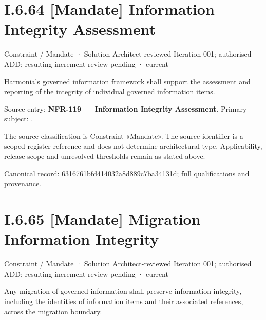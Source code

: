 \section*{I.6.64 [Mandate] Information Integrity Assessment}
\label{navigation:I.6.64}

\label{element:6316761bfd414032a8d889c7ba34131d}
{\small Constraint / Mandate · Solution Architect-reviewed Iteration 001; authorised ADD; resulting increment review pending · current}\par

Harmonia's governed information framework shall support the assessment and reporting of the integrity of individual governed information items.



Source entry: \textbf{NFR-119 — Information Integrity Assessment}. Primary subject: \texttt{}.



The source classification is Constraint «Mandate». The source identifier is a scoped register reference and does not determine architectural type. Applicability, release scope and unresolved thresholds remain as stated above.


{\footnotesize \href{../../../../../../../continuum/motivation/constraint/mandate/6316761bfd414032a8d889c7ba34131d.md}{Canonical record: 6316761bfd414032a8d889c7ba34131d}; full qualifications and provenance.}\par
\section*{I.6.65 [Mandate] Migration Information Integrity}
\label{navigation:I.6.65}

\label{element:22583ccb89dc4cf683c710760bc4b1f2}
{\small Constraint / Mandate · Solution Architect-reviewed Iteration 001; authorised ADD; resulting increment review pending · current}\par

Any migration of governed information shall preserve information integrity, including the identities of information items and their associated references, across the migration boundary.



